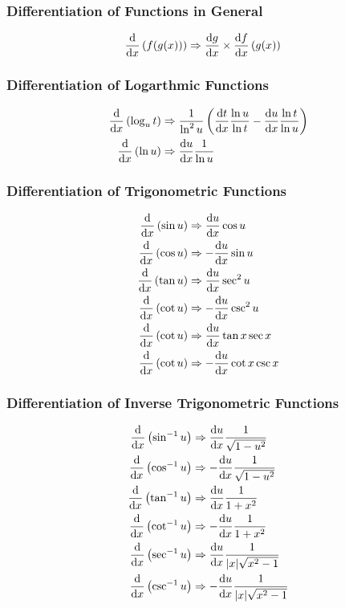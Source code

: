 \documentclass[11pt,a4paper]{book}
\begin{document}
\subsubsection{Differentiation of Functions in General}

\begin{align}
\diff{x}{f(g(x))} &\Rightarrow \sdif{g}{x} \times \sdif{f}{x}\term{g(x)}
\end{align}

\subsubsection{Differentiation of Logarthmic Functions}

\begin{align}
\diff{x}{\log_u{t}} &\Rightarrow \frac{1}{\ln^2u} \term{\sdif{t}{x} \frac{\ln u}{\ln t} - \sdif{u}{x}\frac{\ln t}{\ln u}}\\
\diff{x}{\ln u} &\Rightarrow \sdif{u}{x} \frac{1}{\ln u}
\end{align}


\subsubsection{Differentiation of Trigonometric Functions}

\begin{align}
\diff{x}{\sin{u}} &\Rightarrow \sdif{u}{x} \cos{u}\\
\diff{x}{\cos{u}} &\Rightarrow -\sdif{u}{x} \sin{u}\\
\diff{x}{\tan{u}} &\Rightarrow \sdif{u}{x} \sec^2{u}\\
\diff{x}{\cot{u}} &\Rightarrow -\sdif{u}{x} \csc^2{u}\\
\diff{x}{\cot{u}} &\Rightarrow \sdif{u}{x} \tan{x} \sec{x}\\
\diff{x}{\cot{u}} &\Rightarrow -\sdif{u}{x} \cot{x}\csc{x}
\end{align}

\subsubsection{Differentiation of Inverse Trigonometric Functions}

\begin{align}
\diff{x}{\sin^{-1}u} &\Rightarrow \sdif{u}{x} \frac{1}{\sqrt{1 - u^2}}\\
\diff{x}{\cos^{-1}u} &\Rightarrow -\sdif{u}{x} \frac{1}{\sqrt{1 - u^2}}\\
\diff{x}{\tan^{-1}u} &\Rightarrow \sdif{u}{x} \frac{1}{1 + x^2}\\
\diff{x}{\cot^{-1}u} &\Rightarrow -\sdif{u}{x} \frac{1}{1 + x^2}\\
\diff{x}{\sec^{-1}u} &\Rightarrow \sdif{u}{x} \frac{1}{|x| \sqrt{x^2 - 1}}\\
\diff{x}{\csc^{-1}u} &\Rightarrow -\sdif{u}{x} \frac{1}{|x| \sqrt{x^2 - 1}}
\end{align}
\end{document}
